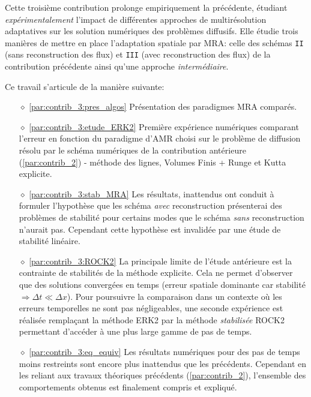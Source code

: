 Cette troisième contribution prolonge empiriquement la précédente,
étudiant \emph{expérimentalement} l'impact de différentes approches de multirésolution adaptatives sur les solution numériques des problèmes diffusifs. 
Elle étudie trois manières de mettre en place l'adaptation spatiale par MRA:
celle des schémas \texttt{II} (sans reconstruction des flux) et
\texttt{III} (avec reconstruction des flux) de la contribution précédente
ainsi qu'une approche \textit{intermédiaire}.\par
Ce travail s'articule de la manière suivante:
\begin{itemize}
\item[$\diamond$]\ref{par:contrib_3:pres_algos} Présentation des paradigmes MRA comparés.
\item[$\diamond$]\ref{par:contrib_3:etude_ERK2} Première expérience numériques comparant l'erreur en fonction du paradigme d'AMR choisi
sur le problème de diffusion résolu par le schéma numériques de la contribution antérieure (\ref{par:contrib_2}) - méthode des lignes, Volumes Finis + Runge et Kutta explicite.
\item[$\diamond$]\ref{par:contrib_3:stab_MRA} Les résultats, inattendus
ont conduit à formuler l'hypothèse que les schéma \emph{avec} reconstruction présenterai des problèmes de stabilité pour certains modes que le schéma \emph{sans} reconstruction n'aurait pas.
Cependant cette hypothèse est invalidée par une étude de stabilité linéaire.
\item[$\diamond$]\ref{par:contrib_3:ROCK2} La principale limite de l'étude antérieure est
la contrainte de stabilités de la méthode explicite. Cela ne permet d'observer que des solutions convergées en temps (erreur spatiale dominante car stabilité $\Rightarrow \Delta t \ll \Delta x$).
Pour poursuivre la comparaison dans un contexte où les erreurs temporelles ne sont pas négligeables, une seconde expérience 
est réalisée remplaçant la méthode ERK2 par la méthode \emph{stabilisée} ROCK2 \cite{abdulle2002fourth} permettant d'accéder à 
une plus large gamme de pas de temps.
\item[$\diamond$]\ref{par:contrib_3:eq_equiv} Les résultats numériques pour des pas de temps moins restreints sont encore plus inattendus que les précédents.
Cependant en les reliant aux travaux théoriques précédents  (\ref{par:contrib_2}), l'ensemble des comportements obtenus est finalement compris et expliqué.
\end{itemize}